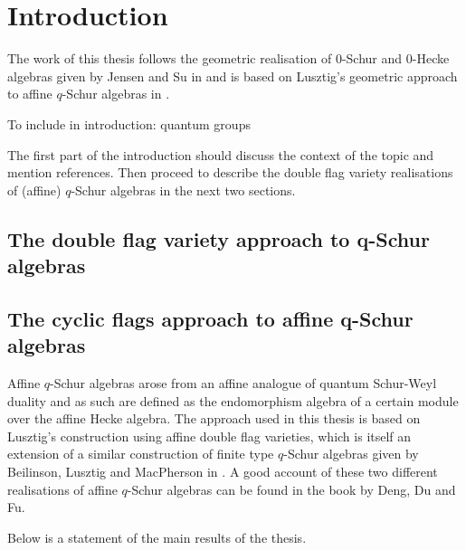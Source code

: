 \documentclass[a4paper, 11pt]{report}
\begin{document}
\maketitle
\tableofcontents

\chapter{Introduction}

The work of this thesis follows the geometric realisation of $0$-Schur and $0$-Hecke algebras given by Jensen and Su in \cite{su12} and is based on Lusztig's geometric approach to affine $q$-Schur algebras in \cite{lusztig99}.


{\color{gray}

To include in introduction:
quantum groups


The first part of the introduction should discuss the context of the topic and mention references. Then proceed to describe the double flag variety realisations of (affine) $q$-Schur algebras in the next two sections.
}

\section{The double flag variety approach to q-Schur algebras}

\section{The cyclic flags approach to affine q-Schur algebras}

Affine $q$-Schur algebras arose from an affine analogue of quantum Schur-Weyl duality and as such are defined as the endomorphism algebra of a certain module over the affine Hecke algebra. The approach used in this thesis is based on Lusztig's construction using affine double flag varieties, which is itself an extension of a similar construction of finite type $q$-Schur algebras given by Beilinson, Lusztig and MacPherson in \cite{blm90}. A good account of these two different realisations of affine $q$-Schur algebras can be found in the book \cite{deng12} by Deng, Du and Fu.



Below is a statement of the main results of the thesis.
\end{document}
